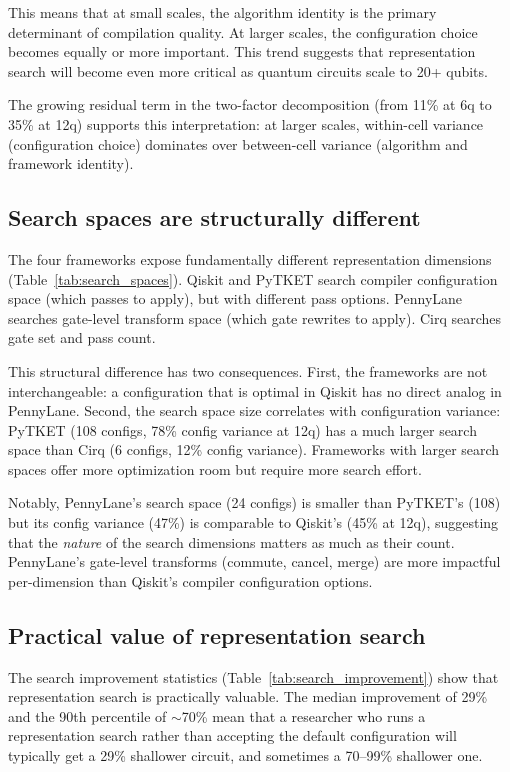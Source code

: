 \documentclass[11pt,a4paper]{article}
\begin{document}
This means that at small scales, the algorithm identity is the primary determinant of compilation quality. At larger scales, the configuration choice becomes equally or more important. This trend suggests that representation search will become even more critical as quantum circuits scale to 20+ qubits.

The growing residual term in the two-factor decomposition (from 11\% at 6q to 35\% at 12q) supports this interpretation: at larger scales, within-cell variance (configuration choice) dominates over between-cell variance (algorithm and framework identity).

\subsection{Search spaces are structurally different}

The four frameworks expose fundamentally different representation dimensions (Table~\ref{tab:search_spaces}). Qiskit and PyTKET search compiler configuration space (which passes to apply), but with different pass options. PennyLane searches gate-level transform space (which gate rewrites to apply). Cirq searches gate set and pass count.

This structural difference has two consequences. First, the frameworks are not interchangeable: a configuration that is optimal in Qiskit has no direct analog in PennyLane. Second, the search space size correlates with configuration variance: PyTKET (108 configs, 78\% config variance at 12q) has a much larger search space than Cirq (6 configs, 12\% config variance). Frameworks with larger search spaces offer more optimization room but require more search effort.

Notably, PennyLane's search space (24 configs) is smaller than PyTKET's (108) but its config variance (47\%) is comparable to Qiskit's (45\% at 12q), suggesting that the \textit{nature} of the search dimensions matters as much as their count. PennyLane's gate-level transforms (commute, cancel, merge) are more impactful per-dimension than Qiskit's compiler configuration options.

\subsection{Practical value of representation search}

The search improvement statistics (Table~\ref{tab:search_improvement}) show that representation search is practically valuable. The median improvement of 29\% and the 90th percentile of $\sim$70\% mean that a researcher who runs a representation search rather than accepting the default configuration will typically get a 29\% shallower circuit, and sometimes a 70--99\% shallower one.
\end{document}
